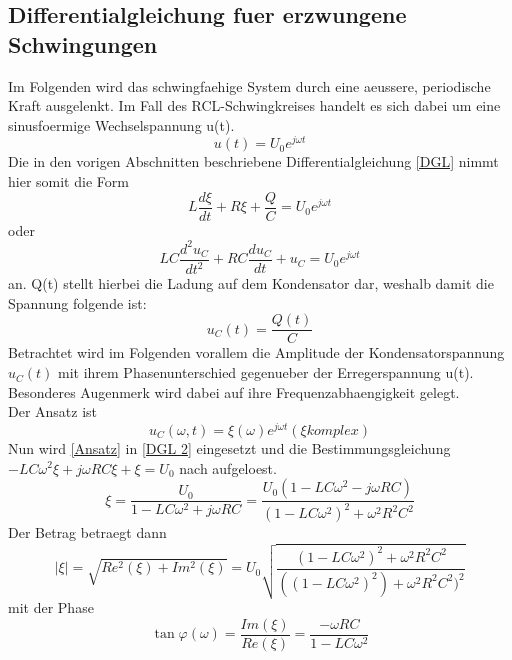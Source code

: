 \documentclass[titlepage=firstcover, captions=tableheading]{scrartcl}
\begin{document}
\subsection{Differentialgleichung fuer erzwungene Schwingungen}
Im Folgenden wird das schwingfaehige System durch eine aeussere, periodische Kraft ausgelenkt. Im Fall des RCL-Schwingkreises handelt es sich dabei um eine sinusfoermige Wechselspannung u(t).
\begin{equation}
    u(t)=U_0e^{j\omega t}\nonumber
\end{equation}
Die in den vorigen Abschnitten beschriebene Differentialgleichung \ref{DGL} nimmt hier somit die Form
\begin{equation}
    L\frac{d\xi}{dt}+R\xi+\frac{Q}{C}=U_0e^{j\omega t}\nonumber
\end{equation}
oder 
\begin{equation}\label{DGL 2}
    LC\frac{d^2u_C}{dt^2}+RC\frac{du_C}{dt}+u_C=U_0e^{j\omega t}
\end{equation}
an. 
Q(t) stellt hierbei die Ladung auf dem Kondensator dar, weshalb damit die Spannung folgende ist:
\begin{equation}
    u_C(t)=\frac{Q(t)}{C}\nonumber
\end{equation}
Betrachtet wird im Folgenden vorallem die Amplitude der Kondensatorspannung $u_C(t)$ mit ihrem Phasenunterschied gegenueber der Erregerspannung u(t). Besonderes Augenmerk wird dabei auf ihre Frequenzabhaengigkeit gelegt.\\
Der Ansatz ist
\begin{equation}\label{Ansatz}
    u_C(\omega, t)=\xi(\omega)e^{j\omega t} (\xi komplex) 
\end{equation}
Nun wird \ref{Ansatz} in \ref{DGL 2} eingesetzt und die Bestimmungsgleichung $-LC\omega^2\xi+j\omega RC\xi+\xi=U_0$ nach \xi  aufgeloest.
\begin{equation}
    \xi=\frac{U_0}{1-LC\omega^2+j\omega RC}=\frac{U_0(1-LC\omega^2-j\omega RC)}{(1-LC\omega^2)^2+\omega^2R^2C^2} \nonumber
\end{equation}
Der Betrag betraegt dann 
\begin{equation}\label{Betrag}
    |\xi|=\sqrt{Re^2(\xi)+Im^2(\xi)}=U_0\sqrt{\frac{(1-LC\omega^2)^2+\omega^2R^2C^2}{((1-LC\omega^2)^2)+\omega^2R^2C^2)^2}}
\end{equation}
mit der Phase
\begin{equation}
    \tan \varphi(\omega)=\frac{Im(\xi)}{Re(\xi)}=\frac{-\omega RC}{1-LC\omega^2}\nonumber
\end{equation}
\end{document}
